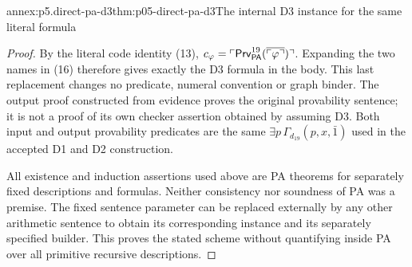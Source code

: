 \begin{annexitem}{annex:p5.direct-pa-d3}{thm:p05-direct-pa-d3}{The internal D3 instance for the same literal formula}
\begin{proof}
By the literal code identity (13),
\(c_\varphi=\ulcorner
\mathsf{Prv}^{19}_{\mathsf{PA}}(\overline{\ulcorner\varphi\urcorner})
\urcorner\). Expanding the two names in (16) therefore gives
exactly the D3 formula in the body. This last replacement changes
no predicate, numeral convention or graph binder. The output proof
constructed from evidence proves the original provability sentence;
it is not a proof of its own checker assertion obtained by assuming
D3. Both input and output provability predicates are the same
\(\exists p\,\Gamma_{d_{19}}(p,x,\bar1)\) used in the accepted
D1 and D2 construction.

All existence and induction assertions used above are PA theorems
for separately fixed descriptions and formulas. Neither consistency
nor soundness of PA was a premise. The fixed sentence parameter can
be replaced externally by any other arithmetic sentence to obtain
its corresponding instance and its separately specified builder.
This proves the stated scheme without quantifying inside PA over
all primitive recursive descriptions.
\end{proof}
\end{annexitem}

